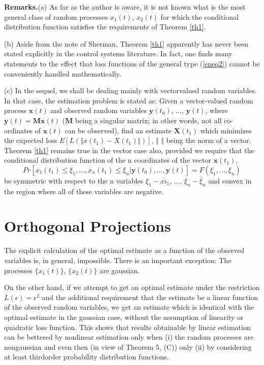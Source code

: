 \documentclass{article}
\begin{document}
\textbf{Remarks.}(a) As far as the author is aware, it is not known what is the most general class of random processes ${x_1(t)}$, ${x_2(t)}$ for which the conditional distribution function satisfies the requirements of Theorem \ref{th1}.

(b) Aside from the note of Sherman, Theorem \ref{th1} apparently has never been stated explicitly in the control systems literature. In fact, one finds many statements to the effect that loss functions of the general type (\ref{eneq2}) cannot be conveniently handled mathematically.

(c) In the sequel, we shall be dealing mainly with vectorvalued random variables. In that case, the estimation problem is stated as: Given a vector-valued random process ${\mathbf{x}(t)}$ and observed random variables $\mathbf{y}(t_0)$, $\dotsc$, $\mathbf{y}(t)$, where $\mathbf{y}(t) = \mathbf{M}\mathbf{x}(t)$ ($\mathbf{M}$ being a singular matrix; in other words, not all co-ordinates of $\mathbf{x}(t)$ can be observed), find an estimate $\mathbf{X}(t_1)$ which minimizes the expected loss $E[L(\Vert x(t_1) - X(t_1)\Vert)]$, $\Vert$ $\Vert$ being the norm of a vector. Theorem \ref{th1} remains true in the vector case also, provided we require that the conditional distribution function of the n coordinates of the vector $\mathbf{x}(t_1)$,
\begin{equation*}
Pr[x_1(t_1) \le \xi_1,\dotsc,x_n(t_1) \le \xi_n \vert \mathbf{y}(t_0),\dotsc,\mathbf{y}(t)]=F(\xi_1,\dotsc,\xi_n)
\end{equation*}
be symmetric with respect to the n variables $\xi_1 - \bar{xi}_1$, $\dotsc$, $\xi_n - \bar{\xi}_n$ and convex in the region where all of these variables are negative.

\section{Orthogonal Projections}
The explicit calculation of the optimal estimate as a function of the observed variables is, in general, impossible. There is an important exception: The processes $\{x_1(t)\}$, $\{x_2(t)\}$ are gaussian.

On the other hand, if we attempt to get an optimal estimate under the restriction $L(\epsilon) = \epsilon^2$ and the additional requirement that the estimate be a linear function of the observed random variables, we get an estimate which is identical with the optimal estimate in the gaussian case, without the assumption of linearity or quadratic loss function. This shows that results obtainable by linear estimation can be bettered by nonlinear estimation only when (i) the random processes are nongaussian and even then (in view of Theorem 5, (C)) only (ii) by considering at least thirdorder probability distribution functions.
\end{document}
